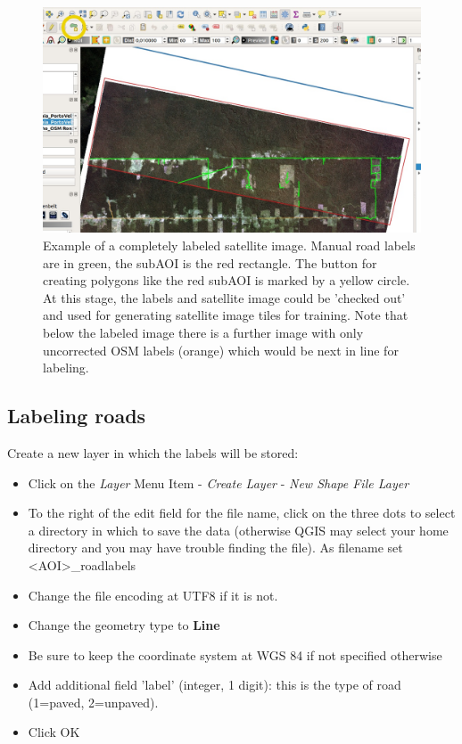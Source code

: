 \documentclass[12pt,a4paper]{scrartcl}
\begin{document}
\begin{figure}[h]
	\centering
	\includegraphics[width=0.9\linewidth]{marking_subAOI01.jpg}
	\caption{Example of a completely labeled satellite image. Manual road labels are in green, the subAOI is the red rectangle. The button for creating polygons like the red subAOI is marked by a yellow circle. At this stage, the labels and satellite image could be 'checked out' and used for generating satellite image tiles for training. Note that below the labeled image there is a further image with only uncorrected OSM labels (orange) which would be next in line for labeling.}
	\label{fig:subaoi}
\end{figure}

\subsection{Labeling roads}
Create a new layer in which the labels will be stored:
\begin{itemize}
	\item Click on the \textit{Layer} Menu Item - \textit{Create Layer} - \textit{New Shape File Layer}
	\item To the right of the edit field for the file name, click on the three dots to select a directory in which to save the data (otherwise QGIS may select your home directory and you may have trouble finding the file). As filename set <AOI>\_roadlabels
	\item Change the file encoding at UTF8 if it is not.
	\item Change the geometry type to \textbf{Line}
	\item Be sure to keep the coordinate system at WGS 84 if not specified otherwise
	\item Add additional field 'label' (integer, 1 digit): this is the type of road (1=paved, 2=unpaved).
	\item Click OK
\end{itemize}
\end{document}
